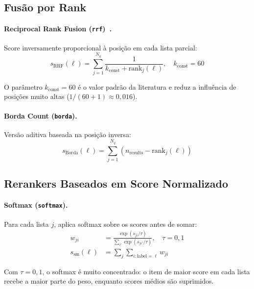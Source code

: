 \documentclass[12pt,a4paper]{article}
\begin{document}
\subsection{Fusão por Rank}

\paragraph{Reciprocal Rank Fusion (\texttt{rrf})~\cite{cormack:09}.}
Score inversamente proporcional à posição em cada lista parcial:
\begin{equation}
  s_{\text{RRF}}(\ell) = \sum_{j=1}^{N_q} \frac{1}{k_{\text{const}} + \text{rank}_j(\ell)},
  \quad k_{\text{const}} = 60
  \label{eq:rrf}
\end{equation}

O parâmetro $k_{\text{const}} = 60$ é o valor padrão da literatura e reduz a
influência de posições muito altas ($1/(60+1) \approx 0{,}016$).

\paragraph{Borda Count (\texttt{borda}).}
Versão aditiva baseada na posição inversa:
\begin{equation}
  s_{\text{Borda}}(\ell) = \sum_{j=1}^{N_q}
    \left(n_{\text{results}} - \text{rank}_j(\ell)\right)
  \label{eq:borda}
\end{equation}

\subsection{Rerankers Baseados em Score Normalizado}

\paragraph{Softmax (\texttt{softmax}).}
Para cada lista $j$, aplica softmax sobre os scores antes de somar:
\begin{align}
  w_{ji} &= \frac{\exp(s_{ji}/\tau)}{\sum_{i'}\exp(s_{ji'}/\tau)},
  \quad \tau = 0{,}1 \label{eq:sm_w}\\
  s_{\text{sm}}(\ell) &= \sum_j \sum_{i: \text{label}=\ell} w_{ji}
  \label{eq:rk_sm}
\end{align}

Com $\tau=0{,}1$, o softmax é muito concentrado: o item de maior score em cada
lista recebe a maior parte do peso, enquanto scores médios são suprimidos.
\end{document}
